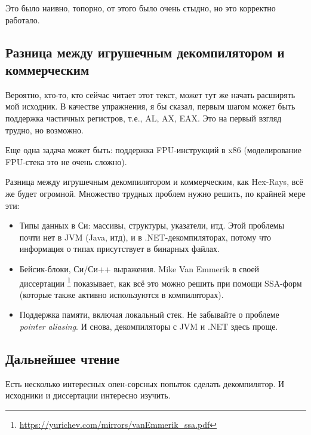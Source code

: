 Это было наивно, топорно, от этого было очень стыдно, но это корректно работало.

\subsection{Разница между игрушечным декомпилятором и коммерческим}

Вероятно, кто-то, кто сейчас читает этот текст, может тут же начать расширять мой исходник.
В качестве упражнения, я бы сказал, первым шагом может быть поддержка частичных регистров, т.е., AL, AX, EAX.
Это на первый взгляд трудно, но возможно.

Еще одна задача может быть: поддержка \ac{FPU}-инструкций в x86 (моделирование \ac{FPU}-стека это не очень сложно).

Разница между игрушечным декомпилятором и коммерческим, как Hex-Rays, всё же будет огромной.
Множество трудных проблем нужно решить, по крайней мере эти:

\begin{itemize}
\item Типы данных в Си: массивы, структуры, указатели, итд.
Этой проблемы почти нет в \ac{JVM} (Java, итд), и в .NET-декомпиляторах, потому что информация о типах присутствует
в бинарных файлах.

\item Бейсик-блоки, Си/Си++ выражения. Mike Van Emmerik в своей диссертации
\footnote{\url{https://yurichev.com/mirrors/vanEmmerik_ssa.pdf}} показывает, как всё это можно решить при помощи
\ac{SSA}-форм (которые также активно используются в компиляторах).

\item Поддержка памяти, включая локальный стек. Не забывайте о проблеме \textit{pointer aliasing}.
И снова, декомпиляторы с \ac{JVM} и .NET здесь проще.
\end{itemize}

\subsection{Дальнейшее чтение}

Есть несколько интересных опен-сорсных попыток сделать декомпилятор.
И исходники и диссертации интересно изучить.

